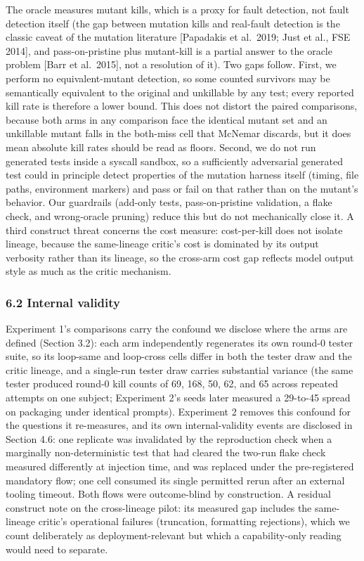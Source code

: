 \documentclass[
  11pt,
]{article}
\begin{document}
The oracle measures mutant kills, which is a proxy for fault detection,
not fault detection itself (the gap between mutation kills and
real-fault detection is the classic caveat of the mutation literature
{[}Papadakis et al.~2019; Just et al., FSE 2014{]}, and
pass-on-pristine plus mutant-kill is a partial answer to the oracle
problem {[}Barr et al.~2015{]}, not a resolution of it). Two gaps
follow. First, we perform no equivalent-mutant detection, so some
counted survivors may be semantically equivalent to the original and
unkillable by any test; every reported kill rate is therefore a lower
bound. This does not distort the paired comparisons, because both arms
in any comparison face the identical mutant set and an unkillable mutant
falls in the both-miss cell that McNemar discards, but it does mean
absolute kill rates should be read as floors. Second, we do not run
generated tests inside a syscall sandbox, so a sufficiently adversarial
generated test could in principle detect properties of the mutation
harness itself (timing, file paths, environment markers) and pass or
fail on that rather than on the mutant's behavior. Our guardrails
(add-only tests, pass-on-pristine validation, a flake check, and
wrong-oracle pruning) reduce this but do not mechanically close it. A
third construct threat concerns the cost measure: cost-per-kill does not
isolate lineage, because the same-lineage critic's cost is dominated by
its output verbosity rather than its lineage, so the cross-arm cost gap
reflects model output style as much as the critic mechanism.

\subsubsection{6.2 Internal validity}\label{internal-validity}

Experiment 1's comparisons carry the confound we disclose where the arms
are defined (Section 3.2): each arm independently regenerates its own
round-0 tester suite, so its loop-same and loop-cross cells differ in
both the tester draw and the critic lineage, and a single-run tester
draw carries substantial variance (the same tester produced round-0 kill
counts of 69, 168, 50, 62, and 65 across repeated attempts on one
subject; Experiment 2's seeds later measured a 29-to-45 spread on
packaging under identical prompts). Experiment 2 removes this confound
for the questions it re-measures, and its own internal-validity events
are disclosed in Section 4.6: one replicate was invalidated by the
reproduction check when a marginally non-deterministic test that had
cleared the two-run flake check measured differently at injection time,
and was replaced under the pre-registered mandatory flow; one cell
consumed its single permitted rerun after an external tooling timeout.
Both flows were outcome-blind by construction. A residual construct note
on the cross-lineage pilot: its measured gap includes the same-lineage
critic's operational failures (truncation, formatting rejections), which
we count deliberately as deployment-relevant but which a capability-only
reading would need to separate.
\end{document}
